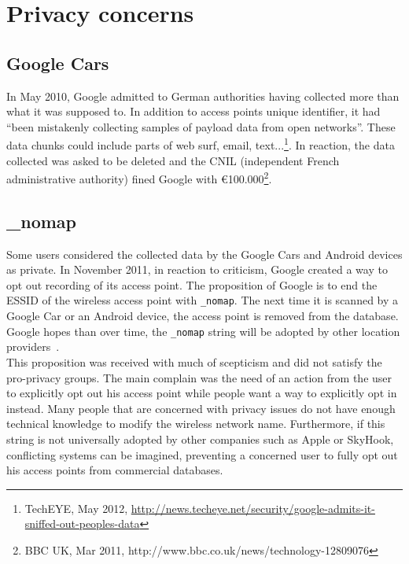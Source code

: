 
\section{Privacy concerns}
\label{sec:andro-priv}

\subsection{Google Cars}
In May 2010, Google admitted to German authorities having collected more than what it was supposed to.
In addition to access points unique identifier, it had ``been mistakenly collecting samples of payload data from open networks''.
These data chunks could include parts of web surf, email, text...\footnote{TechEYE, May 2012, \url{http://news.techeye.net/security/google-admits-it-sniffed-out-peoples-data}}.
In reaction, the data collected was asked to be deleted and the CNIL (independent French administrative authority) fined Google with €100.000\footnote{BBC UK, Mar 2011, http://www.bbc.co.uk/news/technology-12809076}.\\

\subsection{\_nomap}

Some users considered the collected data by the Google Cars and Android devices as private.
In November 2011, in reaction to criticism, Google created a way to opt out recording of its access point.
The proposition of Google is to end the ESSID of the wireless access point with \texttt{\_nomap}.
The next time it is scanned by a Google Car or an Android device, the access point is removed from the database.
Google hopes than over time, the \texttt{\_nomap} string will be adopted by other location providers~\cite{nomap}.\\

This proposition was received with much of scepticism and did not satisfy the pro-privacy groups.
The main complain was the need of an action from the user to explicitly opt out his access point while people want a way to explicitly opt in instead.
Many people that are concerned with privacy issues do not have enough technical knowledge to modify the wireless network name.
Furthermore, if this string is not universally adopted by other companies such as Apple or SkyHook, conflicting systems can be imagined, preventing a concerned user to fully opt out his access points from commercial databases.

